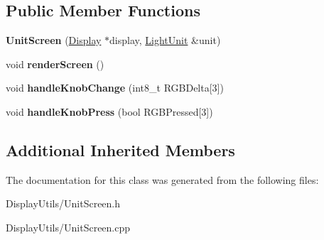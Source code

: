 \subsection*{Public Member Functions}
\begin{DoxyCompactItemize}
\item 
{\bfseries Unit\+Screen} (\hyperlink{classDisplay}{Display} $\ast$display, \hyperlink{classLightUnit}{Light\+Unit} \&unit)\hypertarget{classUnitScreen_aec9e9c593e2c59025096fd01529c874b}{}\label{classUnitScreen_aec9e9c593e2c59025096fd01529c874b}

\item 
void {\bfseries render\+Screen} ()\hypertarget{classUnitScreen_aa6baad6ccef6da111a44d763de359bb8}{}\label{classUnitScreen_aa6baad6ccef6da111a44d763de359bb8}

\item 
void {\bfseries handle\+Knob\+Change} (int8\+\_\+t R\+G\+B\+Delta\mbox{[}3\mbox{]})\hypertarget{classUnitScreen_a4eea15b5c63c97c5a072b151cfa05e84}{}\label{classUnitScreen_a4eea15b5c63c97c5a072b151cfa05e84}

\item 
void {\bfseries handle\+Knob\+Press} (bool R\+G\+B\+Pressed\mbox{[}3\mbox{]})\hypertarget{classUnitScreen_a45956efc8827ebfdddaf83d7c44db135}{}\label{classUnitScreen_a45956efc8827ebfdddaf83d7c44db135}

\end{DoxyCompactItemize}
\subsection*{Additional Inherited Members}


The documentation for this class was generated from the following files\+:\begin{DoxyCompactItemize}
\item 
Display\+Utils/Unit\+Screen.\+h\item 
Display\+Utils/Unit\+Screen.\+cpp\end{DoxyCompactItemize}
